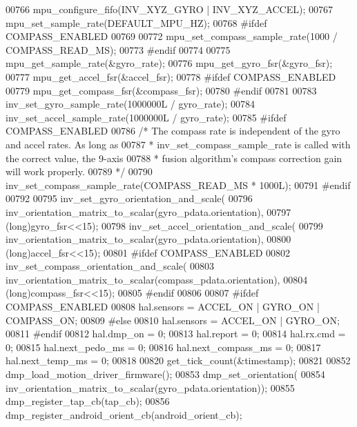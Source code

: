 \begin{DoxyCode}
00766     mpu\_configure\_fifo(INV\_XYZ\_GYRO | INV\_XYZ\_ACCEL);
00767     mpu\_set\_sample\_rate(DEFAULT_MPU_HZ);
00768 \textcolor{preprocessor}{#ifdef COMPASS\_ENABLED}
00769 
00772     mpu\_set\_compass\_sample\_rate(1000 / COMPASS_READ_MS);
00773 \textcolor{preprocessor}{#endif}
00774 
00775     mpu\_get\_sample\_rate(&gyro\_rate);
00776     mpu\_get\_gyro\_fsr(&gyro\_fsr);
00777     mpu\_get\_accel\_fsr(&accel\_fsr);
00778 \textcolor{preprocessor}{#ifdef COMPASS\_ENABLED}
00779     mpu\_get\_compass\_fsr(&compass\_fsr);
00780 \textcolor{preprocessor}{#endif}
00781 
00783     inv\_set\_gyro\_sample\_rate(1000000L / gyro\_rate);
00784     inv\_set\_accel\_sample\_rate(1000000L / gyro\_rate);
00785 \textcolor{preprocessor}{#ifdef COMPASS\_ENABLED}
00786     \textcolor{comment}{/* The compass rate is independent of the gyro and accel rates. As long as}
00787 \textcolor{comment}{     * inv\_set\_compass\_sample\_rate is called with the correct value, the 9-axis}
00788 \textcolor{comment}{     * fusion algorithm's compass correction gain will work properly.}
00789 \textcolor{comment}{     */}
00790     inv\_set\_compass\_sample\_rate(COMPASS_READ_MS * 1000L);
00791 \textcolor{preprocessor}{#endif}
00792 
00795     inv\_set\_gyro\_orientation\_and\_scale(
00796             inv\_orientation\_matrix\_to\_scalar(gyro_pdata.orientation),
00797             (\textcolor{keywordtype}{long})gyro\_fsr<<15);
00798     inv\_set\_accel\_orientation\_and\_scale(
00799             inv\_orientation\_matrix\_to\_scalar(gyro_pdata.orientation),
00800             (\textcolor{keywordtype}{long})accel\_fsr<<15);
00801 \textcolor{preprocessor}{#ifdef COMPASS\_ENABLED}
00802     inv\_set\_compass\_orientation\_and\_scale(
00803             inv\_orientation\_matrix\_to\_scalar(compass\_pdata.orientation),
00804             (\textcolor{keywordtype}{long})compass\_fsr<<15);
00805 \textcolor{preprocessor}{#endif}
00806 
00807 \textcolor{preprocessor}{#ifdef COMPASS\_ENABLED}
00808     hal.sensors = ACCEL_ON | GYRO_ON | COMPASS_ON;
00809 \textcolor{preprocessor}{#else}
00810     hal.sensors = ACCEL_ON | GYRO_ON;
00811 \textcolor{preprocessor}{#endif}
00812     hal.dmp_on = 0;
00813     hal.report = 0;
00814     hal.rx.cmd = 0;
00815     hal.next_pedo_ms = 0;
00816     hal.next_compass_ms = 0;
00817     hal.next_temp_ms = 0;
00818 
00820   get_tick_count(&timestamp);
00821 
00852     dmp\_load\_motion\_driver\_firmware();
00853     dmp\_set\_orientation(
00854         inv\_orientation\_matrix\_to\_scalar(gyro_pdata.orientation));
00855     dmp\_register\_tap\_cb(tap_cb);
00856     dmp\_register\_android\_orient\_cb(android_orient_cb);

\end{DoxyCode}
